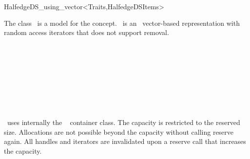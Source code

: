 
\ccRefPageBegin



\begin{ccRefClass}{HalfedgeDS_using_vector<Traits,HalfedgeDSItems>}

\ccDefinition
  
The class \ccRefName\ is a model for the  concept.
\ccRefName\ is an \stl\ vector-based representation with random
access iterators that does not support removal.


\ccIsModel


\ccTypes
{}

\ccGlue
{}

\ccSeeAlso

\\
\\
\\
\\
\\
\\
\\


\ccImplementation

\ccRefName\ uses internally the \stl\  container
class.  The capacity is restricted to the reserved size. Allocations
are not possible beyond the capacity without calling reserve again.
All handles and iterators are invalidated upon a reserve call that
increases the capacity.

\end{ccRefClass}

\ccRefPageEnd

